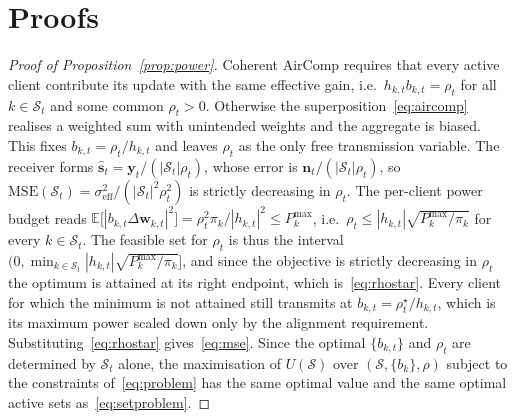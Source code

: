 \documentclass[lettersize,journal]{IEEEtran}
\newcommand{\bw}{\bm{w}}
\newcommand{\calS}{\mathcal{S}}
\begin{document}
\section{Proofs}\label{app:proofs}

\begin{proof}[Proof of Proposition~\ref{prop:power}]
Coherent AirComp requires that every active client contribute its update with the same effective gain, i.e.\ $h_{k,t}b_{k,t}=\rho_{t}$ for all $k\in\calS_t$ and some common $\rho_{t}>0$. Otherwise the superposition~\eqref{eq:aircomp} realises a weighted sum with unintended weights and the aggregate is biased. This fixes $b_{k,t}=\rho_{t}/h_{k,t}$ and leaves $\rho_{t}$ as the only free transmission variable. The receiver forms $\hat{\bm{s}}_t=\bm{y}_t/(|\calS_t|\rho_{t})$, whose error is $\bm{n}_t/(|\calS_t|\rho_{t})$, so
$\mathrm{MSE}(\calS_t)=\sigma^{2}_{\mathrm{eff}}/(|\calS_t|^{2}\rho_{t}^{2})$
is strictly decreasing in $\rho_{t}$. The per-client power budget reads
$\mathbb{E}\big[|b_{k,t}\Delta\bw_{k,t}|^{2}\big]=\rho_{t}^{2}\pi_{k}/|h_{k,t}|^{2}\le P^{\max}_{k}$,
i.e.\ $\rho_{t}\le|h_{k,t}|\sqrt{P^{\max}_{k}/\pi_{k}}$ for every $k\in\calS_t$. The feasible set for $\rho_t$ is thus the interval $\big(0,\min_{k\in\calS_t}|h_{k,t}|\sqrt{P^{\max}_{k}/\pi_{k}}\big]$, and since the objective is strictly decreasing in $\rho_t$ the optimum is attained at its right endpoint, which is~\eqref{eq:rhostar}. Every client for which the minimum is not attained still transmits at $b_{k,t}=\rho^{\star}_{t}/h_{k,t}$, which is its maximum power scaled down only by the alignment requirement. Substituting~\eqref{eq:rhostar} gives~\eqref{eq:mse}. Since the optimal $\{b_{k,t}\}$ and $\rho_{t}$ are determined by $\calS_t$ alone, the maximisation of $U(\calS)$ over $(\calS,\{b_{k}\},\rho)$ subject to the constraints of~\eqref{eq:problem} has the same optimal value and the same optimal active sets as~\eqref{eq:setproblem}.
\end{proof}
\end{document}
